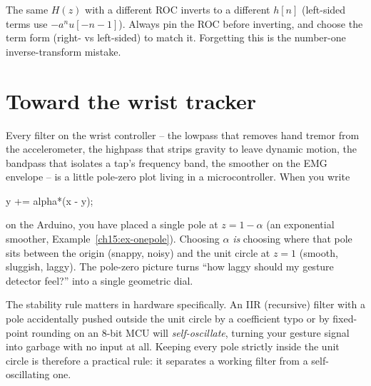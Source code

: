 \begin{trapbox}
The same $H(z)$ with a different ROC inverts to a different $h[n]$ (left-sided terms use
$-a^n u[-n-1]$). Always pin the ROC before inverting, and choose the term form
(right- vs left-sided) to match it. Forgetting this is the number-one inverse-transform
mistake.
\end{trapbox}

\section{Toward the wrist tracker}
\label{ch15:wrist}

\begin{goalbox}
Every filter on the wrist controller -- the lowpass that removes hand tremor from the
accelerometer, the highpass that strips gravity to leave dynamic motion, the bandpass that
isolates a tap's frequency band, the smoother on the EMG envelope -- is a little
pole-zero plot living in a microcontroller. When you write
\begin{center}\ttfamily y += alpha*(x - y);\end{center}
on the Arduino, you have placed a single pole at $z=1-\alpha$ (an exponential smoother,
Example~\ref{ch15:ex-onepole}). Choosing $\alpha$ \emph{is} choosing where that pole sits
between the origin (snappy, noisy) and the unit circle at $z=1$ (smooth, sluggish, laggy).
The pole-zero picture turns ``how laggy should my gesture detector feel?'' into a single
geometric dial.

The stability rule matters in hardware specifically. An IIR (recursive) filter with a
pole accidentally pushed outside the unit circle by a coefficient typo or by fixed-point
rounding on an 8-bit MCU will \emph{self-oscillate}, turning your gesture signal into
garbage with no input at all. Keeping every pole strictly inside the unit circle is therefore a practical rule: it
separates a working filter from a self-oscillating one.
\end{goalbox}

